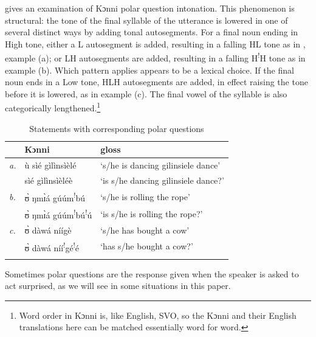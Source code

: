 \documentclass[output=paper]{langsci/langscibook}
\begin{document}
\citet{cahill2012} gives an examination of Kɔnni polar question intonation. This phenomenon is structural: the tone of the final syllable of the utterance is lowered in one of several distinct ways by adding tonal autosegments. For a final noun ending in High tone, either a L autosegment is added, resulting in a falling HL tone as in , example (a); or LH autosegments are added, resulting in a falling H\textsuperscript{!}H tone as in example (b). Which pattern applies appears to be a lexical choice. If the final noun ends in a Low tone, HLH autosegments are added, in effect raising the tone before it is lowered, as in example (c). The final vowel of the syllable is also categorically lengthened.\footnote{Word order in Kɔnni is, like English, SVO, so the Kɔnni and their English translations here can be matched essentially word for word.}

\begin{table}
\begin{tabular}{>{\itshape}lll} 
\lsptoprule
& Kɔnni  & gloss\\
\midrule
\textup{a.}  & ù sìé gìlìnsìèlé & `s/he is dancing gilinsiele dance'\\
    &   sìé gìlìnsìèléè & `is s/he dancing gilinsiele dance?'\\
\textup{b.}  & ʊ̀ ŋmɪ̀á gúúm\textsuperscript{!}bú & `s/he is rolling the rope'\\
    & ʊ̀ ŋmɪ̀á gúúm\textsuperscript{!}bú\textsuperscript{!}ú & `is s/he is rolling the rope?'\\
\textup{c.}  & ʊ̀ dàwá níígè & `s/he has bought a cow'\\
    & ʊ̀ dàwá níí\textsuperscript{!}gé\textsuperscript{!}é & `has s/he bought a cow?'\\
\lspbottomrule
\end{tabular}

\caption{Statements with corresponding polar questions}
\label{tab:1.cahill}
\end{table}



Sometimes polar questions are the response given when the speaker is asked to act surprised, as we will see in some situations in this paper. 
\end{document}
